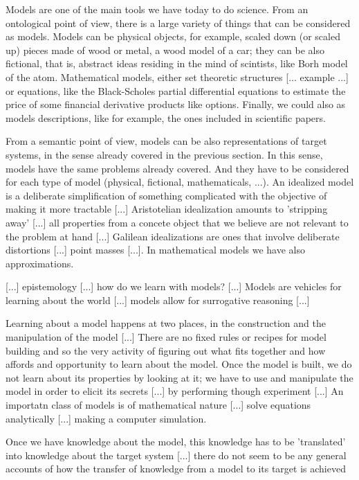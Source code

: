 Models are one of the main tools we have today to do science. From an ontological point of view, there is a large variety of things that can be considered as models. Models can be physical objects, for example, scaled down (or scaled up) pieces made of wood or metal, a wood model of a car; they can be also fictional, that is, abstract ideas residing in the mind of scintists, like Borh model of the atom. Mathematical models, either set theoretic structures [... example ...] or equations, like the Black-Scholes partial differential equations to estimate the price of some financial derivative products like options. Finally, we could also as models descriptions, like for example, the ones included in scientific papers.

From a semantic point of view, models can be also representations of target systems, in the sense already covered in the previous section. In this sense, models have the same problems already covered. And they have to be considered for each type of model (physical, fictional, mathematicals, ...). An idealized model {\color{red} is a deliberate simplification of something complicated with the objective of making it more tractable [...] Aristotelian idealization amounts to 'stripping away' [...] all properties from a concete object that we believe are not relevant to the problem at hand [...] Galilean idealizations are ones that involve deliberate distortions [...] point masses [...].} In mathematical models we have also approximations.

{\color{red} [...] epistemology [...] how do we learn with models? [...] Models are vehicles for learning about the world [...] models allow for surrogative reasoning [...]}

{\color{red} Learning about a model happens at two places, in the construction and the manipulation of the model [...] There are no fixed rules or recipes for model building and so the very activity of figuring out what fits together and how affords and opportunity to learn about the model. Once the model is built, we do not learn about its properties by looking at it; we have to use and manipulate the model in order to elicit its secrets [...] by performing though experiment [...] An importatn class of models is of mathematical nature [...] solve equations analytically [...] making a computer simulation.}

{\color{red} Once we have knowledge about the model, this knowledge has to be 'translated' into knowledge about the target system [...] there do not seem to be any general accounts of how the transfer of knowledge from a model to its target is achieved}

